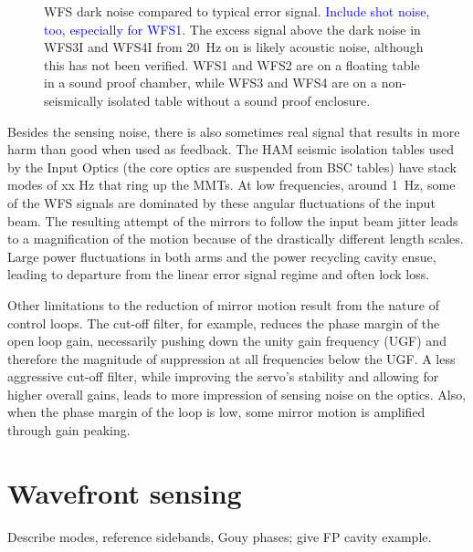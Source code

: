 \begin{figure}
\begin{centering}
\caption[WFS error signal and dark noise]{WFS dark noise compared to typical error signal. \textcolor{blue}{Include shot noise, too, especially for WFS1.} The excess signal above the dark noise in WFS3I and WFS4I from 20~Hz on is likely acoustic noise, although this has not been verified. WFS1 and WFS2 are on a floating table in a sound proof chamber, while WFS3 and WFS4 are on a non-seismically isolated table without a sound proof enclosure.}
\label{fig:WFSdarknoise}
\end{centering}
\end{figure}

Besides the sensing noise, there is also sometimes real signal that results in more harm than good when used as feedback. The HAM seismic isolation tables used by the Input Optics (the core optics are suspended from BSC tables) have stack modes of xx Hz that ring up the MMTs.  At low frequencies, around 1~Hz, some of the WFS signals are dominated by these angular fluctuations of the input beam. The resulting attempt of the mirrors to follow the input beam jitter leads to a magnification of the motion because of the drastically different length scales. Large power fluctuations in both arms and the power recycling cavity ensue, leading to departure from the linear error signal regime and often lock loss. 

Other limitations to the reduction of mirror motion result from the nature of control loops. The cut-off filter, for example, reduces the phase margin of the open loop gain, necessarily pushing down the unity gain frequency (UGF) and therefore the magnitude of suppression at all frequencies below the UGF. A less aggressive cut-off filter, while improving the servo's stability and allowing for higher overall gains, leads to more impression of sensing noise on the optics. Also, when the phase margin of the loop is low, some mirror motion is amplified through gain peaking.





\section{Wavefront sensing}
\label{sec:wfs}
Describe modes, reference sidebands, Gouy phases; give FP cavity example. 




